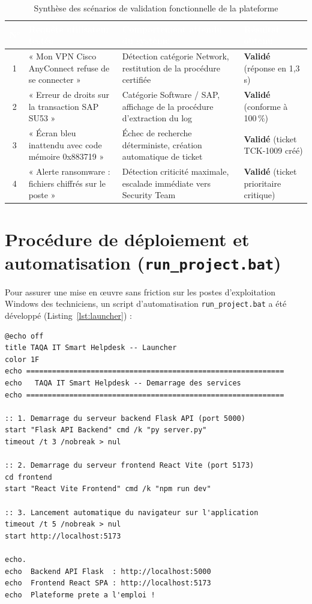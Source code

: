\documentclass[12pt, a4paper, oneside]{report}
\begin{document}
\begin{table}[H]
\centering
\caption{Synthèse des scénarios de validation fonctionnelle de la plateforme}
\label{tab:tests}
\begin{tabularx}{\textwidth}{|c|p{4.2cm}|p{5.5cm}|X|}
\hline
\rowcolor{themeDark}
\textcolor{white}{\textbf{N°}} &
\textcolor{white}{\textbf{Requête utilisateur testée}} &
\textcolor{white}{\textbf{Comportement attendu du système}} &
\textcolor{white}{\textbf{Résultat obtenu}} \\
\hline
1 & « Mon VPN Cisco AnyConnect refuse de se connecter » & Détection catégorie Network, restitution de la procédure certifiée & \textbf{Validé} (réponse en 1,3 s) \\
\hline
2 & « Erreur de droits sur la transaction SAP SU53 » & Catégorie Software / SAP, affichage de la procédure d'extraction du log & \textbf{Validé} (conforme à 100\,\%) \\
\hline
3 & « Écran bleu inattendu avec code mémoire 0x883719 » & Échec de recherche déterministe, création automatique de ticket & \textbf{Validé} (ticket TCK-1009 créé) \\
\hline
4 & « Alerte ransomware : fichiers chiffrés sur le poste » & Détection criticité maximale, escalade immédiate vers Security Team & \textbf{Validé} (ticket prioritaire critique) \\
\hline
\end{tabularx}
\end{table}

\section{Procédure de déploiement et automatisation (\texttt{run\_project.bat})}

Pour assurer une mise en œuvre sans friction sur les postes d'exploitation Windows des techniciens, un script d'automatisation \texttt{run\_project.bat} a été développé (Listing~\ref{lst:launcher}) :

\begin{lstlisting}[style=bash, label={lst:launcher},
  caption={Script de lancement automatisé pour environnement Windows -- \texttt{run\_project.bat}}]
@echo off
title TAQA IT Smart Helpdesk -- Launcher
color 1F
echo ============================================================
echo   TAQA IT Smart Helpdesk -- Demarrage des services
echo ============================================================

:: 1. Demarrage du serveur backend Flask API (port 5000)
start "Flask API Backend" cmd /k "py server.py"
timeout /t 3 /nobreak > nul

:: 2. Demarrage du serveur frontend React Vite (port 5173)
cd frontend
start "React Vite Frontend" cmd /k "npm run dev"

:: 3. Lancement automatique du navigateur sur l'application
timeout /t 5 /nobreak > nul
start http://localhost:5173

echo.
echo  Backend API Flask  : http://localhost:5000
echo  Frontend React SPA : http://localhost:5173
echo  Plateforme prete a l'emploi !
\end{lstlisting}
\end{document}
